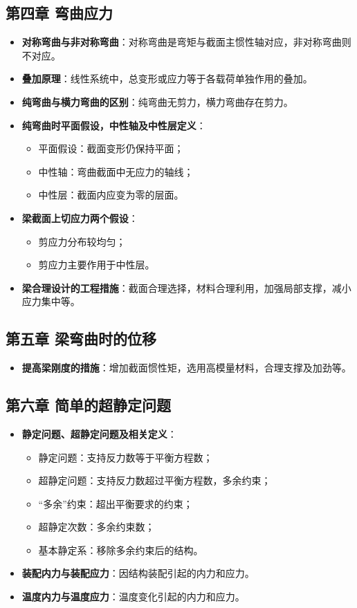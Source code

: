 \documentclass[12pt,a4paper]{article}
\begin{document}
\subsection*{第四章 弯曲应力}
\begin{itemize}
  \item \textbf{对称弯曲与非对称弯曲}：对称弯曲是弯矩与截面主惯性轴对应，非对称弯曲则不对应。
  \item \textbf{叠加原理}：线性系统中，总变形或应力等于各载荷单独作用的叠加。
  \item \textbf{纯弯曲与横力弯曲的区别}：纯弯曲无剪力，横力弯曲存在剪力。
  \item \textbf{纯弯曲时平面假设，中性轴及中性层定义}：
    \begin{itemize}
      \item 平面假设：截面变形仍保持平面；
      \item 中性轴：弯曲截面中无应力的轴线；
      \item 中性层：截面内应变为零的层面。
    \end{itemize}
  \item \textbf{梁截面上切应力两个假设}：
    \begin{itemize}
      \item 剪应力分布较均匀；
      \item 剪应力主要作用于中性层。
    \end{itemize}
  \item \textbf{梁合理设计的工程措施}：截面合理选择，材料合理利用，加强局部支撑，减小应力集中等。
\end{itemize}

\subsection*{第五章 梁弯曲时的位移}
\begin{itemize}
  \item \textbf{提高梁刚度的措施}：增加截面惯性矩，选用高模量材料，合理支撑及加劲等。
\end{itemize}

\subsection*{第六章 简单的超静定问题}
\begin{itemize}
  \item \textbf{静定问题、超静定问题及相关定义}：
    \begin{itemize}
      \item 静定问题：支持反力数等于平衡方程数；
      \item 超静定问题：支持反力数超过平衡方程数，多余约束；
      \item “多余”约束：超出平衡要求的约束；
      \item 超静定次数：多余约束数；
      \item 基本静定系：移除多余约束后的结构。
    \end{itemize}
  \item \textbf{装配内力与装配应力}：因结构装配引起的内力和应力。
  \item \textbf{温度内力与温度应力}：温度变化引起的内力和应力。
\end{itemize}
\end{document}
